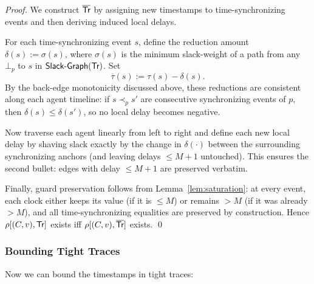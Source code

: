 \begin{proof}
We construct $\overline{\textsf{Tr}}$ by assigning new timestamps to time-synchronizing events and then deriving induced local delays.

For each time-synchronizing event $s$, define the reduction amount $\delta(s) := \sigma(s)$, where $\sigma(s)$ is the minimum slack-weight of a path from any $\bot_p$ to $s$ in $\mathrm{\textsf{Slack-Graph}}(\textsf{Tr})$. Set
\[
    \overline{\tau}(s) := \tau(s) - \delta(s).
\]
By the back-edge monotonicity discussed above, these reductions are consistent along each agent timeline: if $s \prec_p s'$ are consecutive synchronizing events of $p$, then $\delta(s) \le \delta(s')$, so no local delay becomes negative.

Now traverse each agent linearly from left to right and define each new local delay by shaving slack exactly by the change in $\delta(\cdot)$ between the surrounding synchronizing anchors (and leaving delays $\le M{+}1$ untouched). This ensures the second bullet: edges with delay $\le M{+}1$ are preserved verbatim.

Finally, guard preservation follows from Lemma~\ref{lem:saturation}: at every event, each clock either keeps its value (if it is $\le M$) or remains $>M$ (if it was already $>M$), and all time-synchronizing equalities are preserved by construction. Hence $\rho[(C,v),\textsf{Tr}]$ exists iff $\rho[(C,v),\overline{\textsf{Tr}}]$ exists. \qed
\end{proof}

\subsubsection{Bounding Tight Traces}

Now we can bound the timestamps in tight traces:



